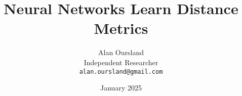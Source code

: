 \documentclass[10pt]{article}
\begin{document}
\title{Neural Networks Learn Distance Metrics}
\author{Alan Oursland\\
Independent Researcher\\
\texttt{alan.oursland@gmail.com}}
\date{January 2025}

\maketitle

\begin{abstract}
    
\end{abstract}
    
\begin{multicols}{2}  %












\end{multicols}
\end{document}
